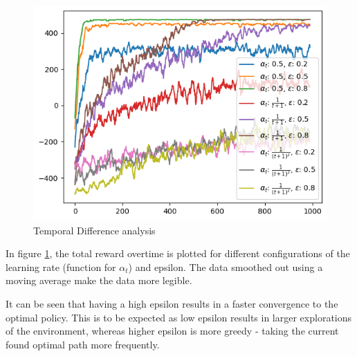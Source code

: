 \begin{figure}[H]
    \centering
    \includegraphics[width=\textwidth]{assets/td/td_analysis.png}        
    \caption{Temporal Difference analysis}
    \label{figure:temporal difference analysis}
\end{figure} 

In figure \ref{figure:temporal difference analysis}, the total reward
overtime is plotted for different configurations of the learning rate
(function for $\alpha_t$) and epsilon. The data smoothed out 
using a moving average make the data more legible.

It can be seen that having a high epsilon results in a faster 
convergence to the optimal policy. This is to be expected as 
low epsilon results in larger explorations of the environment,
whereas higher epsilon is more greedy - taking the current found 
optimal path more frequently. 